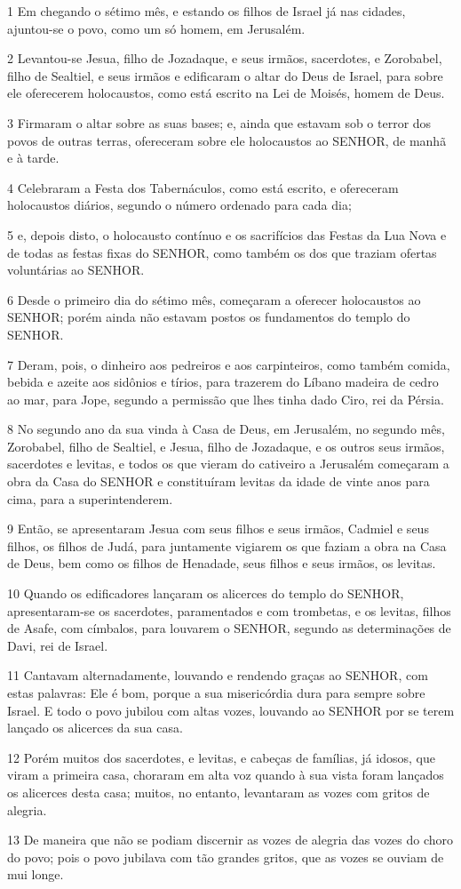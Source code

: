 \par 1 Em chegando o sétimo mês, e estando os filhos de Israel já nas cidades, ajuntou-se o povo, como um só homem, em Jerusalém.
\par 2 Levantou-se Jesua, filho de Jozadaque, e seus irmãos, sacerdotes, e Zorobabel, filho de Sealtiel, e seus irmãos e edificaram o altar do Deus de Israel, para sobre ele oferecerem holocaustos, como está escrito na Lei de Moisés, homem de Deus.
\par 3 Firmaram o altar sobre as suas bases; e, ainda que estavam sob o terror dos povos de outras terras, ofereceram sobre ele holocaustos ao SENHOR, de manhã e à tarde.
\par 4 Celebraram a Festa dos Tabernáculos, como está escrito, e ofereceram holocaustos diários, segundo o número ordenado para cada dia;
\par 5 e, depois disto, o holocausto contínuo e os sacrifícios das Festas da Lua Nova e de todas as festas fixas do SENHOR, como também os dos que traziam ofertas voluntárias ao SENHOR.
\par 6 Desde o primeiro dia do sétimo mês, começaram a oferecer holocaustos ao SENHOR; porém ainda não estavam postos os fundamentos do templo do SENHOR.
\par 7 Deram, pois, o dinheiro aos pedreiros e aos carpinteiros, como também comida, bebida e azeite aos sidônios e tírios, para trazerem do Líbano madeira de cedro ao mar, para Jope, segundo a permissão que lhes tinha dado Ciro, rei da Pérsia.
\par 8 No segundo ano da sua vinda à Casa de Deus, em Jerusalém, no segundo mês, Zorobabel, filho de Sealtiel, e Jesua, filho de Jozadaque, e os outros seus irmãos, sacerdotes e levitas, e todos os que vieram do cativeiro a Jerusalém começaram a obra da Casa do SENHOR e constituíram levitas da idade de vinte anos para cima, para a superintenderem.
\par 9 Então, se apresentaram Jesua com seus filhos e seus irmãos, Cadmiel e seus filhos, os filhos de Judá, para juntamente vigiarem os que faziam a obra na Casa de Deus, bem como os filhos de Henadade, seus filhos e seus irmãos, os levitas.
\par 10 Quando os edificadores lançaram os alicerces do templo do SENHOR, apresentaram-se os sacerdotes, paramentados e com trombetas, e os levitas, filhos de Asafe, com címbalos, para louvarem o SENHOR, segundo as determinações de Davi, rei de Israel.
\par 11 Cantavam alternadamente, louvando e rendendo graças ao SENHOR, com estas palavras: Ele é bom, porque a sua misericórdia dura para sempre sobre Israel. E todo o povo jubilou com altas vozes, louvando ao SENHOR por se terem lançado os alicerces da sua casa.
\par 12 Porém muitos dos sacerdotes, e levitas, e cabeças de famílias, já idosos, que viram a primeira casa, choraram em alta voz quando à sua vista foram lançados os alicerces desta casa; muitos, no entanto, levantaram as vozes com gritos de alegria.
\par 13 De maneira que não se podiam discernir as vozes de alegria das vozes do choro do povo; pois o povo jubilava com tão grandes gritos, que as vozes se ouviam de mui longe.


